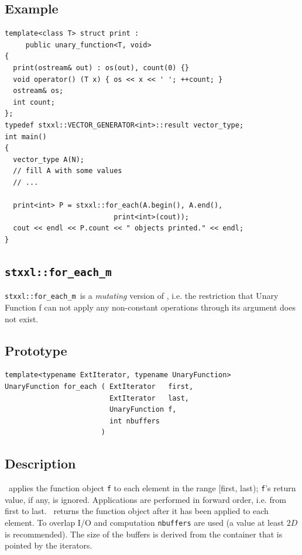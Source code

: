 \documentclass[twoside]{book}
\begin{document}
\subsection*{Example}
\begin{lstlisting}
template<class T> struct print : 
     public unary_function<T, void>
{
  print(ostream& out) : os(out), count(0) {}
  void operator() (T x) { os << x << ' '; ++count; }
  ostream& os;
  int count;
};
typedef stxxl::VECTOR_GENERATOR<int>::result vector_type;
int main()
{
  vector_type A(N);
  // fill A with some values
  // ...  

  print<int> P = stxxl::for_each(A.begin(), A.end(), 
                          print<int>(cout));
  cout << endl << P.count << " objects printed." << endl;
}
\end{lstlisting}

\newcommand{\xforeachm}{{\texttt{stxxl::for\_each\_m}}}
\subsection{\xforeachm}
\xforeachm\ is a \emph{mutating} version of \xforeach, i.e.
the restriction that Unary Function f can not apply any non-constant
operations through its argument does not exist.

\subsection*{Prototype}
\begin{lstlisting}
template<typename ExtIterator, typename UnaryFunction>
UnaryFunction for_each ( ExtIterator   first,
                         ExtIterator   last,
                         UnaryFunction f,
                         int nbuffers
                       )        
\end{lstlisting}
\subsection*{Description}
\xforeach\ applies the function object \texttt{f} to each element in the range
[first, last); \texttt{f}'s return value, if any, is
ignored. Applications are 
performed in forward order, i.e. from first to last. \xforeach\ returns
the function object after it has been applied to each element. 
 To
overlap I/O and computation \texttt{nbuffers} are used (a value at
least $2D$ is recommended). The size of
the buffers is derived from the container that is pointed by the
iterators. 
\end{document}
